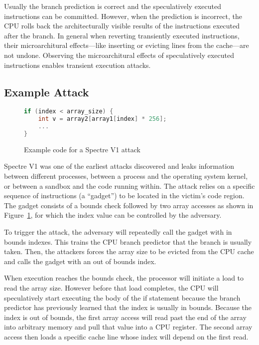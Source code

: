 Usually the branch prediction is correct and the speculatively executed instructions can be committed.
However, when the prediction is incorrect, the CPU rolls back the architecturally visible results of the instructions executed after the branch.
In general when reverting transiently executed instructions, their microarchitural effects---like inserting or evicting lines from the cache---are not undone.
Observing the  microarchitural effects of speculatively executed instructions enables transient execution attacks.

\subsection{Example Attack}
\begin{figure}[h]
\begin{lstlisting}[language=C, style=codeStyle]
if (index < array_size) {
    int v = array2[array1[index] * 256];
    ...
}
\end{lstlisting}
\caption{Example code for a Spectre V1 attack}
\label{fig:spectre-code}
\end{figure}
Spectre V1 was one of the earliest attacks discovered and leaks information between different processes, between a process and the operating system kernel, or between a sandbox and the code running within.
The attack relies on a specific sequence of instructions (a ``gadget'') to be located in the victim's code region.
The gadget consists of a bounds check followed by two array accesses as shown in Figure~\ref{fig:spectre-code}, for which the index value can be controlled by the adversary.

To trigger the attack, the adversary will repeatedly call the gadget with in bounds indexes.
This trains the CPU branch predictor that the branch is usually taken.
Then, the attackers forces the array size to be evicted from the CPU cache and calls the gadget with an out of bounds index.

When execution reaches the bounds check, the processor will initiate a load to read the array size.
However before that load completes, the CPU will speculatively start executing the body of the if statement because the branch predictor has previously learned that the index is usually in bounds.
Because the index is out of bounds, the first array access will read past the end of the array into arbitrary memory and pull that value into a CPU register.
The second array access then loads a specific cache line whose index will depend on the first read.

